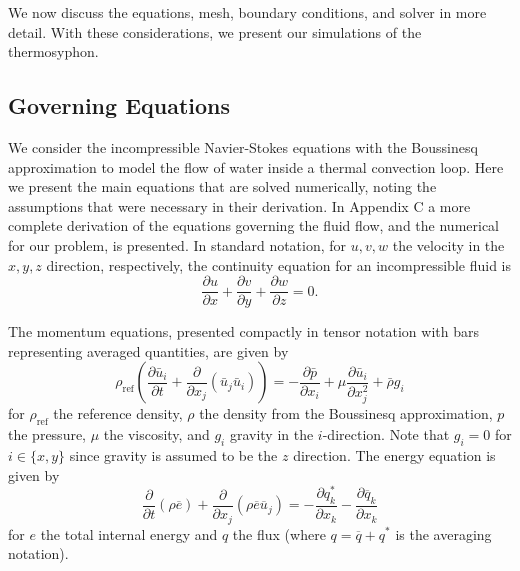 We now discuss the equations, mesh, boundary conditions, and solver in more detail.
With these considerations, we present our simulations of the thermosyphon.

\subsection{Governing Equations}
We consider the incompressible Navier-Stokes equations with the Boussinesq approximation to model the flow of water inside a thermal convection loop.
Here we present the main equations that are solved numerically, noting the assumptions that were necessary in their derivation.
In Appendix C a more complete derivation of the equations governing the fluid flow, and the numerical for our problem, is presented.
In standard notation, for $u,v,w$ the velocity in the $x,y,z$ direction, respectively, the continuity equation for an incompressible fluid is
\begin{equation} \frac{\partial u}{\partial x} + \frac{\partial v}{\partial y} + \frac{\partial w}{\partial z} = 0. \label{eq:NScontIco} \end{equation}

The momentum equations, presented compactly in tensor notation with bars representing averaged quantities, are given by
\begin{equation} \rho_\text{ref} \left ( \frac{\partial \bar{u}_i}{\partial t} + \frac{\partial}{\partial x_j} \left( \bar{u}_j \bar{u}_i \right) \right )
= -\frac{\partial \bar{p}} {\partial{x_i}} +  \mu \frac{\partial \bar{u}_i}{\partial x_j^2} + \bar{\rho} g_i \end{equation}
for $\rho_\text{ref}$ the reference density, $\rho$ the density from the Boussinesq approximation, $p$ the pressure, $\mu$ the viscosity, and $g_i$ gravity in the $i$-direction.
Note that $g_i = 0$ for $i \in \{ x,y\}$ since gravity is assumed to be the $z$ direction.
The energy equation is given by
\begin{equation} \frac{\partial }{\partial t} \left ( \rho \overline{e}\right ) + \frac{\partial}{\partial x_j} \left ( \rho \overline{e} \overline{u}_j \right ) 
= 
- \frac{\partial q_k^*}{\partial x_k}
- \frac{\partial \overline{q}_k}{\partial x_k}
\end{equation}
for $e$ the total internal energy and $q$ the flux (where $q = \overline{q} + q^*$ is the averaging notation).

